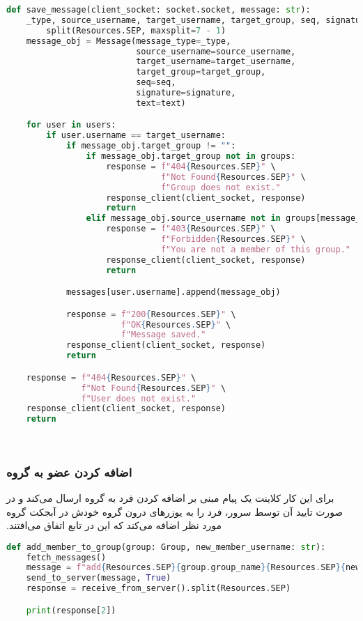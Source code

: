 \begin{latin}
\begin{lstlisting}[firstnumber=181, language=Python]
def save_message(client_socket: socket.socket, message: str):
    _type, source_username, target_username, target_group, seq, signature, text = message. \
        split(Resources.SEP, maxsplit=7 - 1)
    message_obj = Message(message_type=_type,
                          source_username=source_username,
                          target_username=target_username,
                          target_group=target_group,
                          seq=seq,
                          signature=signature,
                          text=text)

    for user in users:
        if user.username == target_username:
            if message_obj.target_group != "":
                if message_obj.target_group not in groups:
                    response = f"404{Resources.SEP}" \
                               f"Not Found{Resources.SEP}" \
                               f"Group does not exist."
                    response_client(client_socket, response)
                    return
                elif message_obj.source_username not in groups[message_obj.target_group].usernames:
                    response = f"403{Resources.SEP}" \
                               f"Forbidden{Resources.SEP}" \
                               f"You are not a member of this group."
                    response_client(client_socket, response)
                    return

            messages[user.username].append(message_obj)

            response = f"200{Resources.SEP}" \
                       f"OK{Resources.SEP}" \
                       f"Message saved."
            response_client(client_socket, response)
            return

    response = f"404{Resources.SEP}" \
               f"Not Found{Resources.SEP}" \
               f"User does not exist."
    response_client(client_socket, response)
    return
\end{lstlisting}
\end{latin}
‫
‫\subsubsection{اضافه کردن عضو به گروه}
‫برای این کار کلاینت یک پیام مبنی بر اضافه کردن فرد به گروه ارسال می‌کند و در صورت تایید آن توسط سرور، فرد را به یوزرهای درون گروه خودش در آبجکت گروه مورد نظر اضافه می‌کند که این در تابع  اتفاق می‌افتند.
‫
\begin{latin}
\begin{lstlisting}[firstnumber=653, language=Python]
def add_member_to_group(group: Group, new_member_username: str):
    fetch_messages()
    message = f"add{Resources.SEP}{group.group_name}{Resources.SEP}{new_member_username}"
    send_to_server(message, True)
    response = receive_from_server().split(Resources.SEP)

    print(response[2])
\end{lstlisting}
\end{latin}

